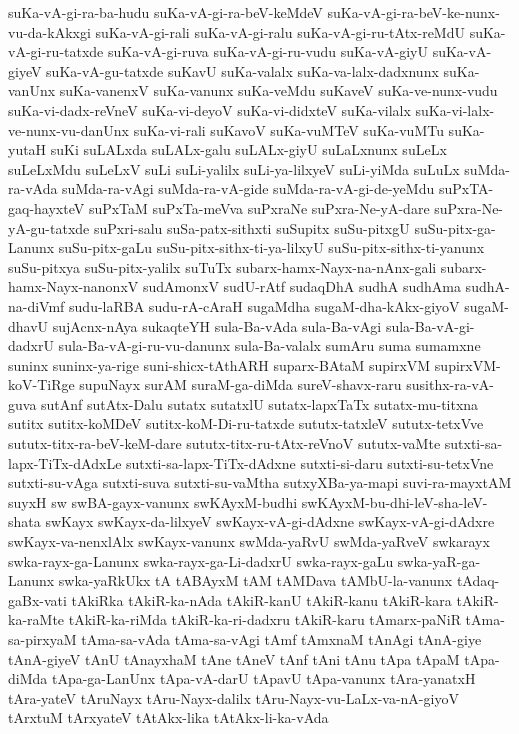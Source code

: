 {suKa-vA-gi-ra-ba-hudu
suKa-vA-gi-ra-beV-keMdeV
suKa-vA-gi-ra-beV-ke-nunx-vu-da-kAkxgi
suKa-vA-gi-rali
suKa-vA-gi-ralu
suKa-vA-gi-ru-tAtx-reMdU
suKa-vA-gi-ru-tatxde
suKa-vA-gi-ruva
suKa-vA-gi-ru-vudu
suKa-vA-giyU
suKa-vA-giyeV
suKa-vA-gu-tatxde
suKavU
suKa-valalx
suKa-va-lalx-dadxnunx
suKa-vanUnx
suKa-vanenxV
suKa-vanunx
suKa-veMdu
suKaveV
suKa-ve-nunx-vudu
suKa-vi-dadx-reVneV
suKa-vi-deyoV
suKa-vi-didxteV
suKa-vilalx
suKa-vi-lalx-ve-nunx-vu-danUnx
suKa-vi-rali
suKavoV
suKa-vuMTeV
suKa-vuMTu
suKa-yutaH
suKi
suLALxda
suLALx-galu
suLALx-giyU
suLaLxnunx
suLeLx
suLeLxMdu
suLeLxV
suLi
suLi-yalilx
suLi-ya-lilxyeV
suLi-yiMda
suLuLx
suMda-ra-vAda
suMda-ra-vAgi
suMda-ra-vA-gide
suMda-ra-vA-gi-de-yeMdu
suPxTA-gaq-hayxteV
suPxTaM
suPxTa-meVva
suPxraNe
suPxra-Ne-yA-dare
suPxra-Ne-yA-gu-tatxde
suPxri-salu
suSa-patx-sithxti
suSupitx
suSu-pitxgU
suSu-pitx-ga-Lanunx
suSu-pitx-gaLu
suSu-pitx-sithx-ti-ya-lilxyU
suSu-pitx-sithx-ti-yanunx
suSu-pitxya
suSu-pitx-yalilx
suTuTx
subarx-hamx-Nayx-na-nAnx-gali
subarx-hamx-Nayx-nanonxV
sudAmonxV
sudU-rAtf
sudaqDhA
sudhA
sudhAma
sudhA-na-diVmf
sudu-laRBA
sudu-rA-cAraH
sugaMdha
sugaM-dha-kAkx-giyoV
sugaM-dhavU
sujAcnx-nAya
sukaqteYH
sula-Ba-vAda
sula-Ba-vAgi
sula-Ba-vA-gi-dadxrU
sula-Ba-vA-gi-ru-vu-danunx
sula-Ba-valalx
sumAru
suma
sumamxne
suninx
suninx-ya-rige
suni-shicx-tAthARH
suparx-BAtaM
supirxVM
supirxVM-koV-TiRge
supuNayx
surAM
suraM-ga-diMda
sureV-shavx-raru
susithx-ra-vA-guva
sutAnf
sutAtx-Dalu
sutatx
sutatxlU
sutatx-lapxTaTx
sutatx-mu-titxna
sutitx
sutitx-koMDeV
sutitx-koM-Di-ru-tatxde
sututx-tatxleV
sututx-tetxVve
sututx-titx-ra-beV-keM-dare
sututx-titx-ru-tAtx-reVnoV
sututx-vaMte
sutxti-sa-lapx-TiTx-dAdxLe
sutxti-sa-lapx-TiTx-dAdxne
sutxti-si-daru
sutxti-su-tetxVne
sutxti-su-vAga
sutxti-suva
sutxti-su-vaMtha
sutxyXBa-ya-mapi
suvi-ra-mayxtAM
suyxH
sw
swBA-gayx-vanunx
swKAyxM-budhi
swKAyxM-bu-dhi-leV-sha-leV-shata
swKayx
swKayx-da-lilxyeV
swKayx-vA-gi-dAdxne
swKayx-vA-gi-dAdxre
swKayx-va-nenxlAlx
swKayx-vanunx
swMda-yaRvU
swMda-yaRveV
swkarayx
swka-rayx-ga-Lanunx
swka-rayx-ga-Li-dadxrU
swka-rayx-gaLu
swka-yaR-ga-Lanunx
swka-yaRkUkx
tA
tABAyxM
tAM
tAMDava
tAMbU-la-vanunx
tAdaq-gaBx-vati
tAkiRka
tAkiR-ka-nAda
tAkiR-kanU
tAkiR-kanu
tAkiR-kara
tAkiR-ka-raMte
tAkiR-ka-riMda
tAkiR-ka-ri-dadxru
tAkiR-karu
tAmarx-paNiR
tAma-sa-pirxyaM
tAma-sa-vAda
tAma-sa-vAgi
tAmf
tAmxnaM
tAnAgi
tAnA-giye
tAnA-giyeV
tAnU
tAnayxhaM
tAne
tAneV
tAnf
tAni
tAnu
tApa
tApaM
tApa-diMda
tApa-ga-LanUnx
tApa-vA-darU
tApavU
tApa-vanunx
tAra-yanatxH
tAra-yateV
tAruNayx
tAru-Nayx-dalilx
tAru-Nayx-vu-LaLx-va-nA-giyoV
tArxtuM
tArxyateV
tAtAkx-lika
tAtAkx-li-ka-vAda
}
